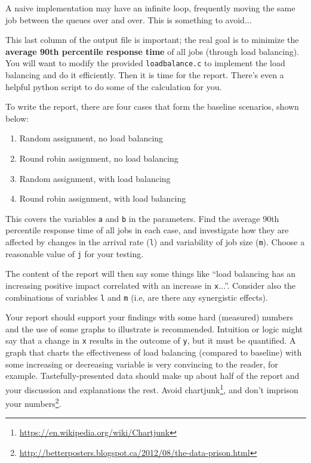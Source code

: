 \documentclass[letterpaper,10pt]{article}
\begin{document}
A naive implementation may have an infinite loop, frequently moving the same job between the queues over and over. This is something to avoid...

This last column of the output file is important; the real goal is to minimize the \textbf{average 90th percentile response time} of all jobs (through load balancing). You will want to modify the provided \texttt{loadbalance.c} to implement the load balancing and do it efficiently. Then it is time for the report. There's even a helpful python script to do some of the calculation for you.

To write the report, there are four cases that form the baseline scenarios, shown below: 

\begin{enumerate}
	\item Random assignment, no load balancing
	\item Round robin assignment, no load balancing
	\item Random assignment, with load balancing
	\item Round robin assignment, with load balancing
\end{enumerate}

This covers the variables \texttt{a} and \texttt{b} in the parameters. Find the average 90th percentile response time of all jobs in each case, and investigate how they are affected by changes in the arrival rate (\texttt{l}) and variability of job size (\texttt{m}). Choose a reasonable value of \texttt{j} for your testing.

The content of the report will then say some things like ``load balancing has an increasing positive impact correlated with an increase in \texttt{x}...''. Consider also the combinations of variables \texttt{l} and \texttt{m} (i.e, are there any synergistic effects).

Your report should support your findings with some hard (measured) numbers and the use of some graphs to illustrate is recommended. Intuition or logic might say that a change in \texttt{x} results in the outcome of \texttt{y}, but it must be quantified. A graph that charts the effectiveness of load balancing (compared to baseline) with some increasing or decreasing variable is very convincing to the reader, for example. Tastefully-presented data should make up about half of the report and your discussion and explanations the rest. Avoid chartjunk\footnote{\url{https://en.wikipedia.org/wiki/Chartjunk}}, and don't imprison your numbers\footnote{\url{http://betterposters.blogspot.ca/2012/08/the-data-prison.html}}.
\end{document}
